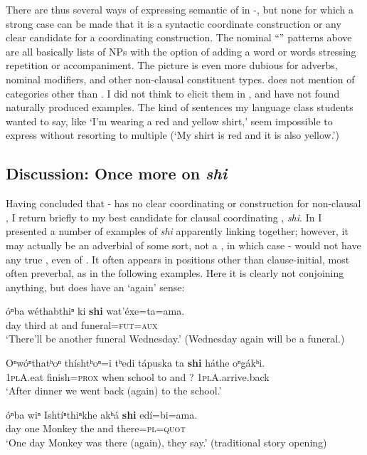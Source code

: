 \documentclass[output=paper]{LSP/langsci}
\begin{document}
There are thus several ways of expressing semantic  of  in -, but none for which a strong case can be made that it is a syntactic coordinate construction or any clear candidate for a coordinating construction. The nominal ``'' patterns above are all basically lists of NPs with the option of adding a word or words stressing repetition or accompaniment. The picture is even more dubious for adverbs, nominal modifiers, and other non-clausal constituent types. \citet{Koontz1984} does not mention  of categories other than . I did not think to elicit them in , and have not found naturally produced examples.  The kind of sentences my  language class students wanted to say, like `I'm wearing a red and yellow shirt,' seem impossible to express without resorting to multiple  (`My shirt is red and it is also yellow.')

\subsection{Discussion: Once more on \textit{shi}}

Having concluded that - has no clear coordinating  or  construction for non-clausal , I return briefly to my best candidate for clausal coordinating , \textit{shi}. In  I presented a number of examples of \textit{shi} apparently linking  together; however, it may actually be an adverbial of some sort, not a , in which case - would not have any true , even of . It often appears in positions other than clause-initial, most often preverbal, as in the following examples. Here it is clearly not conjoining anything, but does have an `again' sense:  

\begin{exe}	
\ex\label{ex:rudin:32}
\gll óⁿba 	wéthabthiⁿ 	ki 	\textbf{shi}  	wat'éxe=ta=ama.  \\
day  	third          	at 	and 	funeral=\textsc{fut=aux}  \\
\trans `There'll be another funeral Wednesday.'   (Wednesday again will be a funeral.)

\ex\label{ex:rudin:33} 
\gll Oⁿwóⁿthatʰoⁿ thíshtʰoⁿ=i 	tʰedi 	tápuska 	ta 	\textbf{shi}  háthe 	oⁿgákʰi. \\
\textsc{1plA}.eat  	finish=\textsc{prox} 	when 	school 	to 	and ?  	\textsc{1plA}.arrive.back \\
\trans `After dinner we went back (again) to the school.'

\ex\label{ex:rudin:34}
\gll óⁿba 	wiⁿ 	Ishtíⁿthiⁿkhe 	akʰá \textbf{shi} edí=bi=ama. \\
day	one 	Monkey 	the 	and 	there=\textsc{pl=quot} \\
\trans `One day Monkey was there (again), they say.'  (traditional story opening)
\end{exe}
\end{document}

